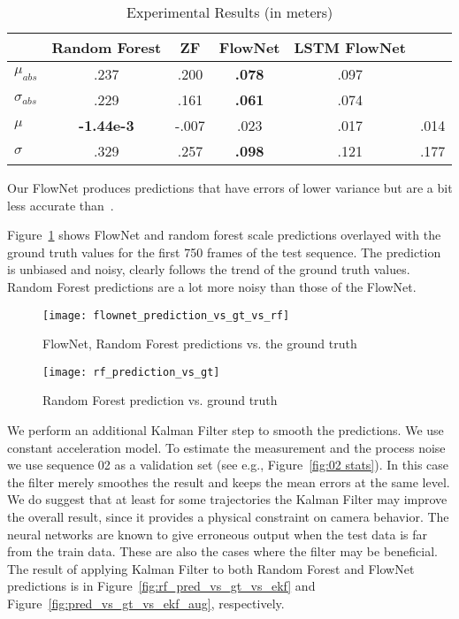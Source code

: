 \begin{table}[ht]
  \centering
  \begin{tabular}{ lccccc }
    \hline
                       & Random Forest     & ZF    & FlowNet          & LSTM FlowNet & \cite{frost2016}   \\
    \hline
    $\mu_{abs}$        & .237              & .200  & \textbf{.078}    & .097         & \\
    $\sigma_{abs}$     & .229              & .161  & \textbf{.061}    & .074         & \\
    $\mu$              & \textbf{-1.44e-3} & -.007 & .023             & .017         & .014\\
    $\sigma$           & .329              & .257  & \textbf{.098}    & .121         & .177\\
    \hline
  \end{tabular}
  \caption{Experimental Results (in meters)}
  \label{table:main result}
\end{table}

Our FlowNet produces predictions that have errors of lower variance
but are a bit less accurate than~\cite{frost2017using}.

Figure~\ref{fig:pred_vs_gt} shows FlowNet and random forest scale
predictions overlayed with the ground truth values for the first 750
frames of the test sequence.  The prediction is unbiased and noisy,
clearly follows the trend of the ground truth values.  Random Forest
predictions are a lot more noisy than those of the FlowNet.

\begin{figure}[!ht]
  \centering
  \texttt{[image: flownet\_prediction\_vs\_gt\_vs\_rf]}
  \caption{FlowNet, Random Forest predictions vs. the ground truth}
  \label{fig:pred_vs_gt}
\end{figure}

\begin{figure}[!ht]
  \centering
  \texttt{[image: rf\_prediction\_vs\_gt]}
  \caption{Random Forest prediction vs. ground truth}
  \label{fig:rf_pred_vs_gt}
\end{figure}

We perform an additional Kalman Filter step to smooth the predictions.
We use constant acceleration model.  To estimate the measurement and
the process noise we use sequence 02 as a validation set (see e.g.,
Figure~\ref{fig:02 stats}).  In this case the filter merely smoothes
the result and keeps the mean errors at the same level.  We do suggest
that at least for some trajectories the Kalman Filter may improve the
overall result, since it provides a physical constraint on camera
behavior.  The neural networks are known to give erroneous output when
the test data is far from the train data.  These are also the cases
where the filter may be beneficial.  The result of applying Kalman
Filter to both Random Forest and FlowNet predictions is in
Figure~\ref{fig:rf_pred_vs_gt_vs_ekf} and
Figure~\ref{fig:pred_vs_gt_vs_ekf_aug}, respectively.

